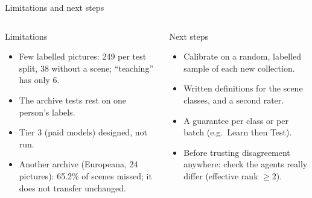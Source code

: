 \documentclass[aspectratio=169,10pt]{beamer}
\begin{document}
\begin{frame}{Limitations and next steps}
\begin{columns}[T,onlytextwidth]
\begin{defbox}{Limitations}
\begin{itemize}\setlength\itemsep{2pt}
\item Few labelled pictures: 249 per test split, 38 without a scene; ``teaching'' has only 6.
\item The archive tests rest on one person's labels.
\item Tier 3 (paid models) designed, not run.
\item Another archive (Europeana, 24 pictures): 65.2\% of scenes missed; it does not transfer unchanged.
\end{itemize}
\end{defbox}
\begin{defbox}{Next steps}
\begin{itemize}\setlength\itemsep{2pt}
\item Calibrate on a random, labelled sample of each new collection.
\item Written definitions for the scene classes, and a second rater.
\item A guarantee per class or per batch (e.g.\ Learn then Test).
\item Before trusting disagreement anywhere: check the agents really differ (effective rank $\geq 2$).
\end{itemize}
\end{defbox}
\end{columns}
\end{frame}
\end{document}
